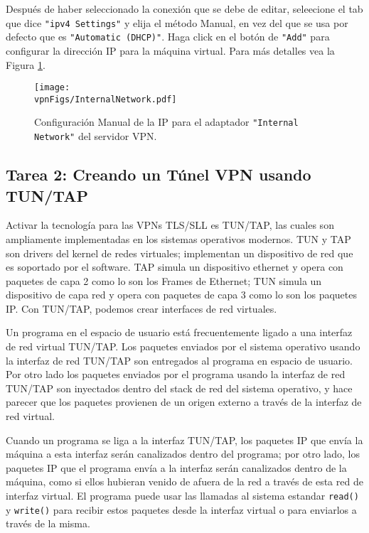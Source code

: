 Después de haber seleccionado la conexión que se debe de editar, seleecione el tab que dice \texttt{"ipv4 Settings"} y elija el método Manual, en vez del que se usa por defecto que es \texttt{"Automatic (DHCP)"}. Haga click en el botón de \texttt{"Add"}  para configurar la dirección IP para la máquina virtual. Para más detalles vea la Figura  \ref{vpn:fig:internalnetwork}.



\begin{figure}[htb]
\begin{center}
\texttt{[image: \\vpnFigs/InternalNetwork.pdf]}
\end{center}
\caption{Configuración Manual de la IP para el adaptador \texttt{"Internal Network"} del servidor VPN.}
\label{vpn:fig:internalnetwork}
\end{figure}
 


\subsection{Tarea 2: Creando un Túnel VPN usando TUN/TAP}

Activar la tecnología para las VPNs TLS/SLL es TUN/TAP, las cuales son ampliamente implementadas en los sistemas operativos modernos.
TUN y TAP son drivers del kernel de redes virtuales; implementan un dispositivo de red que es soportado por el software.
TAP simula un dispositivo ethernet y opera con paquetes de capa 2 como lo son los Frames de Ethernet; TUN simula un dispositivo de capa red y opera con paquetes de capa 3 como lo son los paquetes IP.
Con TUN/TAP, podemos crear interfaces de red virtuales.

Un programa en el espacio de usuario está frecuentemente ligado a una interfaz de red virtual TUN/TAP.
Los paquetes enviados por el sistema operativo usando la interfaz de red TUN/TAP son entregados al programa en espacio de usuario. Por otro lado los paquetes enviados por el programa usando la interfaz de red TUN/TAP son inyectados dentro del stack de red del sistema operativo, y hace parecer que los paquetes provienen de un origen externo a través de la interfaz de red virtual.

Cuando un programa se liga a la interfaz TUN/TAP, los paquetes IP que envía la máquina a esta interfaz serán canalizados dentro del programa; por otro lado, los paquetes IP que el programa envía a la interfaz serán canalizados dentro de la máquina, como si ellos hubieran venido de afuera de la red a través de esta red de interfaz virtual. El programa puede usar las llamadas al sistema estandar  {\tt read()} y {\tt write()} para recibir estos paquetes desde la interfaz virtual o para enviarlos a través de la misma.


